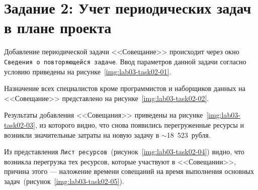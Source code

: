 \section{Задание 2: Учет периодических задач в плане проекта}

Добавление периодической задачи <<Совещание>> происходит через окно
\texttt{Сведения о повторяющейся задаче}. Ввод параметров данной задачи согласно
условию приведены на рисунке~\ref{img:lab03-task02-01}.


Назначение всех специалистов кроме программистов и наборщиков данных на
<<Совещание>> представлено на рисунке~\ref{img:lab03-task02-02}.


Результаты добавления <<Совещания>> приведены на
рисунке~\ref{img:lab03-task02-03}, из которого видно, что снова появились
перегруженные ресурсы и возникли значительные затраты на новую задачу в
$\sim$18~523~рубля.


Из представления \texttt{Лист ресурсов}~(рисунок~\ref{img:lab03-task02-04})
видно, что возникла перегрузка тех ресурсов, которые участвуют в <<Совещании>>,
причина этого --- наложение времени совещаний на время выполнения основных
задач~(рисунок~\ref{img:lab03-task02-05}).



